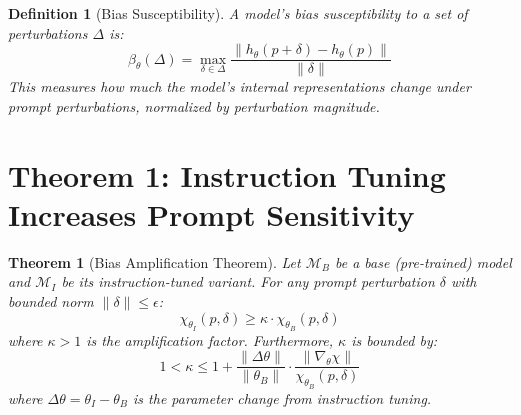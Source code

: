 \documentclass[11pt]{article}
\newtheorem{theorem}{Theorem}
\newtheorem{definition}{Definition}
\begin{document}
\begin{definition}[Bias Susceptibility]
A model's bias susceptibility to a set of perturbations $\Delta$ is:
\begin{equation}
\beta_\theta(\Delta) = \max_{\delta \in \Delta} \frac{\|h_\theta(p+\delta) - h_\theta(p)\|}{\|\delta\|}
\end{equation}
This measures how much the model's internal representations change under prompt perturbations, normalized by perturbation magnitude.
\end{definition}

\section{Theorem 1: Instruction Tuning Increases Prompt Sensitivity}

\begin{theorem}[Bias Amplification Theorem]
Let $\mathcal{M}_B$ be a base (pre-trained) model and $\mathcal{M}_I$ be its instruction-tuned variant. For any prompt perturbation $\delta$ with bounded norm $\|\delta\| \leq \epsilon$:
\begin{equation}
\chi_{\theta_I}(p, \delta) \geq \kappa \cdot \chi_{\theta_B}(p, \delta)
\end{equation}
where $\kappa > 1$ is the amplification factor. Furthermore, $\kappa$ is bounded by:
\begin{equation}
1 < \kappa \leq 1 + \frac{\|\Delta\theta\|}{\|\theta_B\|} \cdot \frac{\|\nabla_\theta \chi\|}{\chi_{\theta_B}(p, \delta)}
\end{equation}
where $\Delta\theta = \theta_I - \theta_B$ is the parameter change from instruction tuning.
\end{theorem}
\end{document}

